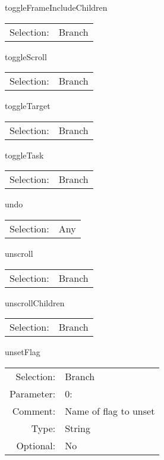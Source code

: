 \item toggleFrameIncludeChildren\\
\begin{tabular}{rl}
  Selection: & Branch\\
\end{tabular}

\item toggleScroll\\
\begin{tabular}{rl}
  Selection: & Branch\\
\end{tabular}

\item toggleTarget\\
\begin{tabular}{rl}
  Selection: & Branch\\
\end{tabular}

\item toggleTask\\
\begin{tabular}{rl}
  Selection: & Branch\\
\end{tabular}

\item undo\\
\begin{tabular}{rl}
  Selection: & Any\\
\end{tabular}

\item unscroll\\
\begin{tabular}{rl}
  Selection: & Branch\\
\end{tabular}

\item unscrollChildren\\
\begin{tabular}{rl}
  Selection: & Branch\\
\end{tabular}

\item unsetFlag\\
\begin{tabular}{rl}
  Selection: & Branch\\
   Parameter: &  0:\\
        Comment: & Name of flag to unset\\
           Type: & String\\
       Optional: &  No\\
\end{tabular}

